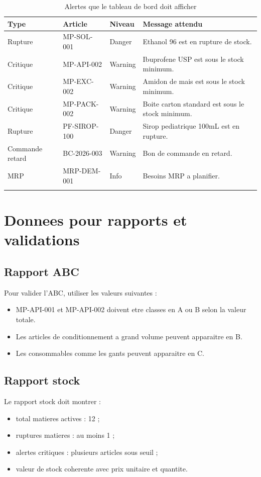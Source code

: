 \documentclass[11pt,a4paper]{article}
\begin{document}
\begin{longtable}{|p{3cm}|p{3cm}|p{3cm}|p{5cm}|}
\hline
\textbf{Type} & \textbf{Article} & \textbf{Niveau} & \textbf{Message attendu} \\
\hline
Rupture & MP-SOL-001 & Danger & Ethanol 96 est en rupture de stock. \\
\hline
Critique & MP-API-002 & Warning & Ibuprofene USP est sous le stock minimum. \\
\hline
Critique & MP-EXC-002 & Warning & Amidon de mais est sous le stock minimum. \\
\hline
Critique & MP-PACK-002 & Warning & Boite carton standard est sous le stock minimum. \\
\hline
Rupture & PF-SIROP-100 & Danger & Sirop pediatrique 100mL est en rupture. \\
\hline
Commande retard & BC-2026-003 & Warning & Bon de commande en retard. \\
\hline
MRP & MRP-DEM-001 & Info & Besoins MRP a planifier. \\
\hline
\caption{Alertes que le tableau de bord doit afficher}
\end{longtable}

\section{Donnees pour rapports et validations}

\subsection{Rapport ABC}

Pour valider l'ABC, utiliser les valeurs suivantes :
\begin{itemize}
  \item MP-API-001 et MP-API-002 doivent etre classes en A ou B selon la valeur totale.
  \item Les articles de conditionnement a grand volume peuvent apparaitre en B.
  \item Les consommables comme les gants peuvent apparaitre en C.
\end{itemize}

\subsection{Rapport stock}

Le rapport stock doit montrer :
\begin{itemize}
  \item total matieres actives : 12 ;
  \item ruptures matieres : au moins 1 ;
  \item alertes critiques : plusieurs articles sous seuil ;
  \item valeur de stock coherente avec prix unitaire et quantite.
\end{itemize}
\end{document}
